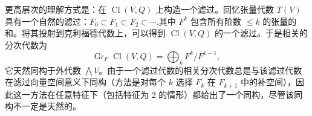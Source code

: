 更高层次的理解方式是：在 $\operatorname{Cl}(V, Q)$ 上构造一个滤过。回忆张量代数 $T(V)$ 具有一个自然的滤过：$F_0 \subset F_1 \subset F_2 \subset \cdots$,其中 $F^k$ 包含所有阶数 $\leq k$ 的张量的和。将其投射到克利福德代数上，可以得到 $\operatorname{Cl}(V, Q)$ 的一个滤过。于是相关的分次代数为
$$
\operatorname{Gr}_F \operatorname{Cl}(V, Q) = \bigoplus_k F^k / F^{k-1},~
$$
它天然同构于外代数 $\bigwedge V$。由于一个滤过代数的相关分次代数总是与该滤过代数在滤过向量空间意义下同构（方法是对每个 $k$ 选择 $F_k$ 在 $F_{k+1}$ 中的补空间），因此这一方法在任意特征下（包括特征为 2 的情形）都给出了一个同构，尽管该同构不一定是天然的。
